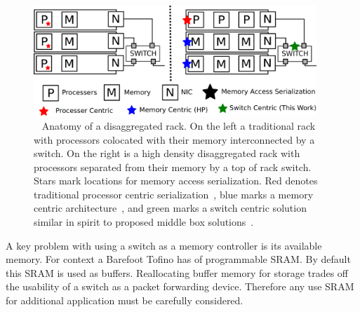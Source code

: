 
\begin{figure}
      \centering
      \includegraphics[width=0.95\textwidth]{fig/overview.png}
      \caption{~
      Anatomy of a disaggregated rack. On the left a
      traditional rack with processors colocated with their memory
      interconnected by a switch. On the right is a high density
      disaggregated rack with processors separated from their memory
      by a top of rack switch. Stars mark locations for memory access
      serialization. Red denotes traditional processor centric
      serialization~\cite{memc3, cell, sonuma, storm, clover}, blue marks a
      memory centric architecture~\cite{aguilera2019designing}, and
      green marks a switch centric solution similar in spirit to
      proposed middle box solutions~\cite{254120}.
      \label{fig:overview}
      }
\end{figure}



A key problem with using a switch as a memory controller is its
available memory. For context a Barefoot Tofino has  of
programmable SRAM. By default this SRAM is used as buffers.
Reallocating buffer memory for storage trades off the usability of a
switch as a packet forwarding device. Therefore any use SRAM for
additional application must be carefully considered. 


